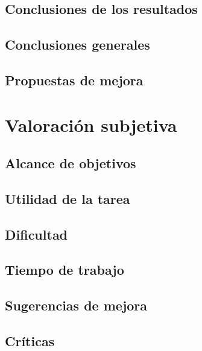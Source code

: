 \documentclass[a4paper]{report}
\begin{document}
	\section{Conclusiones de los resultados}
	
	\section{Conclusiones generales}
	
	\section{Propuestas de mejora}


\newpage




\chapter{Valoración subjetiva}
	
	\section*{Alcance de objetivos}
	
	\section*{Utilidad de la tarea}
	
	\section*{Dificultad}
	
	\section*{Tiempo de trabajo}
	
	\section*{Sugerencias de mejora}
	
	\section*{Críticas}
\end{document}
